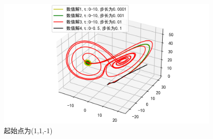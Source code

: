 \documentclass[a4paper]{article}%
\begin{document}
\begin{figure}[H]
    \centering
    \includegraphics[scale=0.8]{25}
    \caption{起始点为(1,1,-1)}
\end{figure}
\end{document}
